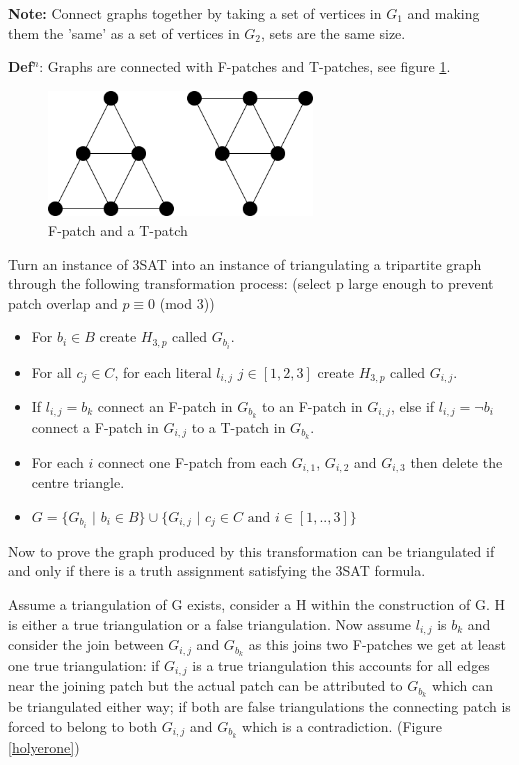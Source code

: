 \documentclass[a4paper,11pt]{report}
\begin{document}
\textbf{Note:} Connect graphs together by taking a set of vertices in $G_1$ and making them the 'same' as a set of vertices in $G_2$, sets are the same size.

\textbf{Def$^n$}: Graphs are connected with F-patches and T-patches, see figure \ref{patches}. 

\begin{figure}[h!]
\begin{center}
		\includegraphics[width=70mm]{figures/patches.png}
\end{center}
		\caption{F-patch and a T-patch}
		\label{patches}
\end{figure}

Turn an instance of 3SAT into an instance of triangulating a tripartite graph through the following transformation process: (select p large enough to prevent patch overlap and  $p\equiv 0 $ (mod 3))
\begin{itemize}
\item For $b_i\in B$ create $H_{3,p}$ called $G_{b_i}$.
\item For all $c_j\in C$, for each literal $l_{i,j}$ $j\in [1,2,3]$ create $H_{3,p}$ called $G_{i,j}$.
\item If $l_{i,j}=b_k$ connect an F-patch in $G_{b_k}$ to an F-patch in $G_{i,j}$, else if $l_{i,j}=\neg b_i$ connect a F-patch in $G_{i,j}$ to a T-patch in $G_{b_k}$.
\item For each $i$ connect one F-patch from each $G_{i,1}$, $G_{i,2}$ and $G_{i,3}$ then delete the centre triangle. 
\item $G = \{G_{b_i}$ $|$ $b_i \in B\}\cup\{G_{i,j}$ $|$ $ c_j\in C\text{ and }i\in [1,..,3] \}$
\end{itemize}
Now to prove the graph produced by this transformation can be triangulated if and only if there is a truth assignment satisfying the 3SAT formula.

Assume a triangulation of G exists, consider a H within the construction of G. H is either a true triangulation or a false triangulation. Now assume $l_{i,j}$ is $b_k$ and consider the join between $G_{i,j}$ and $G_{b_k}$ as this joins two F-patches we get at least one true triangulation: if $G_{i,j}$ is a true triangulation this accounts for all edges near the joining patch but the actual patch can be attributed to $G_{b_k}$ which can be triangulated either way; if both are false triangulations the connecting patch is forced to belong to both $G_{i,j}$ and $G_{b_k}$ which is a contradiction. (Figure \ref{holyerone})
\end{document}
